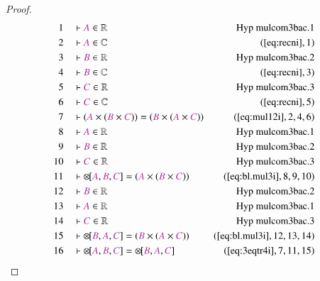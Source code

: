 \begin{proof}
\begin{align}
  1 &&  & \vdash \mc{A} \in
\mathbb{R}&\text{Hyp~mulcom3bac.1}\notag%
  \\ 2 &&  & \vdash \mc{A} \in \mathbb{C}&(\mbox{\ref{eq:recni}},1)\notag
  \\ 3 &&  & \vdash \mc{B} \in
\mathbb{R}&\text{Hyp~mulcom3bac.2}\notag%
  \\ 4 &&  & \vdash \mc{B} \in \mathbb{C}&(\mbox{\ref{eq:recni}},3)\notag
  \\ 5 &&  & \vdash \mc{C} \in
\mathbb{R}&\text{Hyp~mulcom3bac.3}\notag%
  \\ 6 &&  & \vdash \mc{C} \in \mathbb{C}&(\mbox{\ref{eq:recni}},5)\notag
  \\ 7 &&  & \vdash ( \mc{A} \times ( \mc{B} \times \mc{C} ) ) = ( \mc{B} \times (
      \mc{A} \times \mc{C} )
      )&(\mbox{\ref{eq:mul12i}},2,4,6)\notag
  \\ 8 &&  & \vdash \mc{A} \in
\mathbb{R}&\text{Hyp~mulcom3bac.1}\notag%
  \\ 9 &&  & \vdash \mc{B} \in
\mathbb{R}&\text{Hyp~mulcom3bac.2}\notag%
  \\ 10 &&  & \vdash \mc{C} \in
\mathbb{R}&\text{Hyp~mulcom3bac.3}\notag%
  \\ 11 &&  & \vdash {\otimes\hspace{-1pt}[} \mc{A} , \mc{B} , \mc{C} ] = (
      \mc{A} \times ( \mc{B} \times \mc{C} )
      )&(\mbox{\ref{eq:bl.mul3i}},8,9,10)\notag
  \\ 12 &&  & \vdash \mc{B} \in
\mathbb{R}&\text{Hyp~mulcom3bac.2}\notag%
  \\ 13 &&  & \vdash \mc{A} \in
\mathbb{R}&\text{Hyp~mulcom3bac.1}\notag%
  \\ 14 &&  & \vdash \mc{C} \in
\mathbb{R}&\text{Hyp~mulcom3bac.3}\notag%
  \\ 15 &&  & \vdash {\otimes\hspace{-1pt}[} \mc{B} , \mc{A} , \mc{C} ] = (
      \mc{B} \times ( \mc{A} \times \mc{C} )
      )&(\mbox{\ref{eq:bl.mul3i}},12,13,14)\notag
  \\ 16 &&  & \vdash {\otimes\hspace{-1pt}[} \mc{A} , \mc{B} , \mc{C} ] =
      {\otimes\hspace{-1pt}[} \mc{B} , \mc{A} , \mc{C}
      ]&(\mbox{\ref{eq:3eqtr4i}},7,11,15)\notag
\end{align}
\end{proof}

